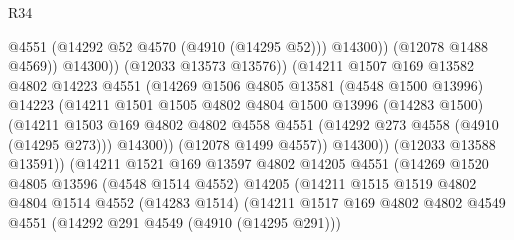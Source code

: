 \begin{lexlean}{R34}
\begin{coremodule}
                                      @4551
                                      (@14292 @52 @4570 (@4910 (@14295 @52)))
                                      @14300))
                                  (@12078 @1488 @4569))
                                @14300))
                            (@12033 @13573 @13576))
                          (@14211
                            @1507
                            @169
                            @13582
                            @4802
                            @14223
                            @4551
                            (@14269
                              @1506
                              @4805
                              @13581
                              (@4548 @1500 @13996)
                              @14223
                              (@14211
                                @1501
                                @1505
                                @4802
                                @4804
                                @1500
                                @13996
                                (@14283 @1500)
                                (@14211
                                  @1503
                                  @169
                                  @4802
                                  @4802
                                  @4558
                                  @4551
                                  (@14292 @273 @4558 (@4910 (@14295 @273)))
                                  @14300))
                              (@12078 @1499 @4557))
                            @14300))
                        (@12033 @13588 @13591))
                      (@14211
                        @1521
                        @169
                        @13597
                        @4802
                        @14205
                        @4551
                        (@14269
                          @1520
                          @4805
                          @13596
                          (@4548 @1514 @4552)
                          @14205
                          (@14211
                            @1515
                            @1519
                            @4802
                            @4804
                            @1514
                            @4552
                            (@14283 @1514)
                            (@14211
                              @1517
                              @169
                              @4802
                              @4802
                              @4549
                              @4551
                              (@14292 @291 @4549 (@4910 (@14295 @291)))

\end{coremodule}
\end{lexlean}
